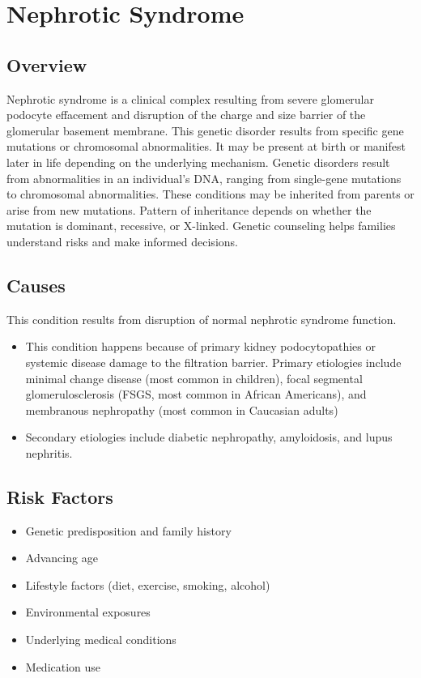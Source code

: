 \chapter{Nephrotic Syndrome}
\label{sec:Nephrotic Syndrome}

\section{Overview}
Nephrotic syndrome is a clinical complex resulting from severe glomerular podocyte effacement and disruption of the charge and size barrier of the glomerular basement membrane. This genetic disorder results from specific gene mutations or chromosomal abnormalities. It may be present at birth or manifest later in life depending on the underlying mechanism. Genetic disorders result from abnormalities in an individual's DNA, ranging from single-gene mutations to chromosomal abnormalities. These conditions may be inherited from parents or arise from new mutations. Pattern of inheritance depends on whether the mutation is dominant, recessive, or X-linked. Genetic counseling helps families understand risks and make informed decisions.
\section{Causes}
This condition results from disruption of normal nephrotic syndrome function.

\begin{itemize}[noitemsep]
  \item This condition happens because of primary kidney podocytopathies or systemic disease damage to the filtration barrier. Primary etiologies include minimal change disease (most common in children), focal segmental glomerulosclerosis (FSGS, most common in African Americans), and membranous nephropathy (most common in Caucasian adults)
  \item Secondary etiologies include diabetic nephropathy, amyloidosis, and lupus nephritis.
\end{itemize}
\section{Risk Factors}


\begin{itemize}[noitemsep]
  \item Genetic predisposition and family history
  \item Advancing age
  \item Lifestyle factors (diet, exercise, smoking, alcohol)
  \item Environmental exposures
  \item Underlying medical conditions
  \item Medication use
\end{itemize}
